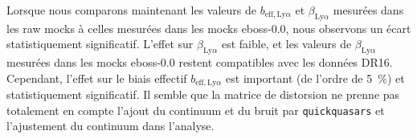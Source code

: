 \documentclass[11pt, twoside, a4paper, openright]{report}
\begin{document}
Lorsque nous comparons maintenant les valeurs de $b_{\mathrm{eff},\mathrm{Ly}\alpha}$ et $\beta_{\mathrm{Ly}\alpha}$ mesurées dans les raw mocks à celles mesurées dans les mocks eboss-0.0, nous observons un écart statistiquement significatif. L'effet sur $\beta_{\mathrm{Ly}\alpha}$ est faible, et les valeurs de $\beta_{\mathrm{Ly}\alpha}$ mesurées dans les mocks eboss-0.0 restent compatibles avec les données DR16.
Cependant, l'effet sur le biais effectif $b_{\mathrm{eff},\mathrm{Ly}\alpha}$ est important (de l'ordre de \SI{5}{\percent}) et statistiquement significatif.
Il semble que la matrice de distorsion ne prenne pas totalement en compte l'ajout du continuum et du bruit par \texttt{quickquasars} et l'ajustement du continuum dans l'analyse.
\end{document}
